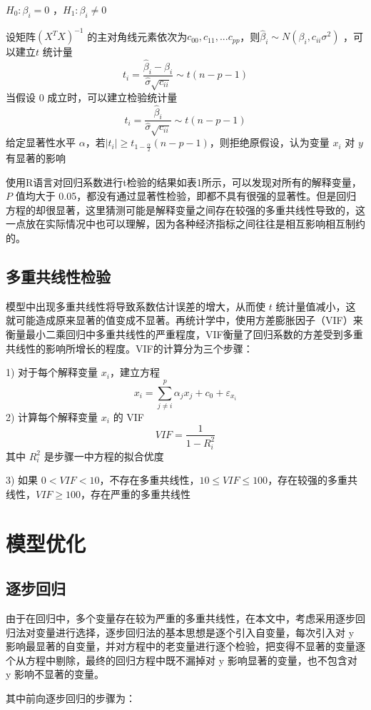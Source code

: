 \documentclass [a4paper]{article}
\begin{document}
$H_0: \beta_i=0$ ，$H_1:\beta_i \ne 0$

设矩阵$(X^TX)^{-1}$ 的主对角线元素依次为$c_{00},c_{11},...c_{pp}$，则$\hat \beta_i \sim N(\beta_i,c_{ii}\sigma^2)$ ，可以建立$t$ 统计量
$$
t_i =\frac{\hat \beta_i - \beta_i}{\hat \sigma \sqrt{c_{ii}}} \sim t(n-p-1)
$$
 当假设 0 成立时，可以建立检验统计量
$$
t_i = \frac{\hat \beta_i}{\hat \sigma \sqrt{c_{ii}}} \sim t(n-p-1)
$$
给定显著性水平 $\alpha $，若$|t_i| \ge t_{1-\frac{\alpha}{2}}(n-p-1)$，则拒绝原假设，认为变量 $x_i$ 对 $y$ 有显著的影响

使用R语言对回归系数进行t检验的结果如表1所示，可以发现对所有的解释变量，$P$ 值均大于 0.05，都没有通过显著性检验，即都不具有很强的显著性。但是回归方程的却很显著，这里猜测可能是解释变量之间存在较强的多重共线性导致的，这一点放在实际情况中也可以理解，因为各种经济指标之间往往是相互影响相互制约的。

\subsection{多重共线性检验}

模型中出现多重共线性将导致系数估计误差的增大，从而使 $t$ 统计量值减小，这就可能造成原来显著的值变成不显著。再统计学中，使用方差膨胀因子（VIF）来衡量最小二乘回归中多重共线性的严重程度，VIF衡量了回归系数的方差受到多重共线性的影响所增长的程度。VIF的计算分为三个步骤：

1) 对于每个解释变量 $x_i$，建立方程
$$
x_i = \sum_{j \ne i}^p \alpha_jx_j+c_0 +\varepsilon_{x_i}
$$
2) 计算每个解释变量 $x_i$ 的 VIF
$$
VIF = \frac{1}{1-R^2_i}
$$
其中 $R_i^2$ 是步骤一中方程的拟合优度

3)  如果 $0<VIF<10$，不存在多重共线性，$10 \le VIF \le 100$，存在较强的多重共线性，$VIF \ge 100$，存在严重的多重共线性

\section{模型优化}

\subsection{逐步回归}
由于在回归中，多个变量存在较为严重的多重共线性，在本文中，考虑采用逐步回归法对变量进行选择，逐步回归法的基本思想是逐个引入自变量，每次引入对 y 影响最显著的自变量，并对方程中的老变量进行逐个检验，把变得不显著的变量逐个从方程中剔除，最终的回归方程中既不漏掉对 y 影响显著的变量，也不包含对 y 影响不显著的变量。

其中前向逐步回归的步骤为：
\end{document}
